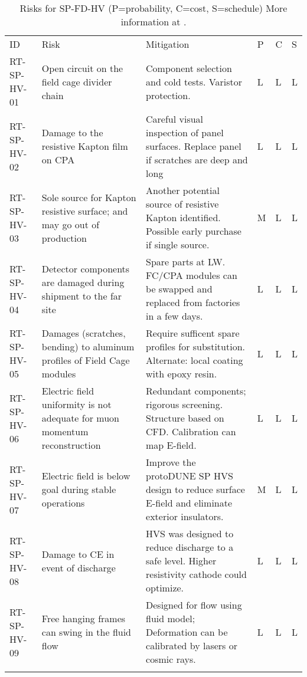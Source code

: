 
\begin{footnotesize}
\begin{longtable}{x{0.18\textwidth}x{0.20\textwidth}x{0.32\textwidth}x{0.02\textwidth}x{0.02\textwidth}x{0.02\textwidth}} 
\caption[Risks for SP-FD-HV]{Risks for SP-FD-HV (P=probability, C=cost, S=schedule) More information at . } \\
ID & Risk & Mitigation & P & C & S  \\  \colhline
RT-SP-HV-01 & Open circuit on the field cage divider chain & Component selection and cold tests. Varistor protection. & L & L & L \\  \colhline
RT-SP-HV-02 & Damage to the resistive Kapton film on CPA & Careful visual inspection of panel surfaces.  Replace panel if scratches are deep and long  & L & L & L \\  \colhline
RT-SP-HV-03 & Sole source for Kapton resistive surface; and may go out of production & Another potential source of resistive Kapton identified. Possible early purchase if single source. & M & L & L \\  \colhline
RT-SP-HV-04 & Detector components are damaged during shipment to the far site  & Spare parts at  LW. FC/CPA modules can be swapped and replaced from factories in a few days. & L & L & L \\  \colhline
RT-SP-HV-05 & Damages (scratches, bending) to aluminum profiles of Field Cage modules & Require sufficent spare profiles for substitution. Alternate: local coating with epoxy resin. & L & L & L \\  \colhline
RT-SP-HV-06 & Electric field uniformity is not adequate for muon momentum reconstruction  & Redundant components; rigorous screening. Structure based on CFD. Calibration can map E-field. & L & L & L \\  \colhline
RT-SP-HV-07 & Electric field is below goal during stable operations & Improve the protoDUNE SP HVS design to reduce surface E-field and eliminate exterior insulators. & M & L & L \\  \colhline
RT-SP-HV-08 & Damage to CE in event of discharge  & HVS was designed to reduce discharge to a safe level. Higher resistivity cathode could optimize. & L & L & L \\  \colhline
RT-SP-HV-09 & Free hanging frames can swing in the fluid flow  & Designed for flow using fluid model; Deformation can be calibrated by lasers or cosmic rays. & L & L & L \\  \colhline

\end{longtable}
\end{footnotesize}
